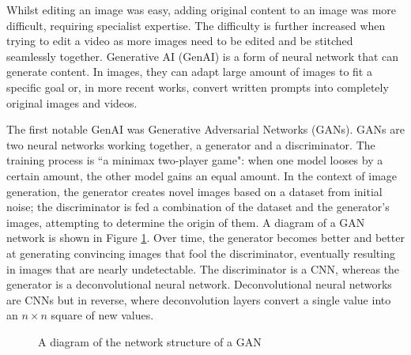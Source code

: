 Whilst editing an image was easy, adding original content to an image was more difficult, requiring specialist expertise. The difficulty is further increased when trying to edit a video as more images need to be edited and be stitched seamlessly together. Generative AI (GenAI) is a form of neural network that can generate content. In images, they can adapt large amount of images to fit a specific goal or, in more recent works, convert written prompts into completely original images and videos.

The first notable GenAI was Generative Adversarial Networks (GANs)\cite{goodfellow2014generative}. GANs are two neural networks working together, a generator and a discriminator. The training process is ``a minimax two-player game": when one model looses by a certain amount, the other model gains an equal amount. In the context of image generation, the generator creates novel images based on a dataset from initial noise; the discriminator is fed a combination of the dataset and the generator's images, attempting to determine the origin of them. A diagram of a GAN network is shown in Figure \ref{fig:gan-diagram}. Over time, the generator becomes better and better at generating convincing images that fool the discriminator, eventually resulting in images that are nearly undetectable. The discriminator is a CNN, whereas the generator is a deconvolutional neural network\cite{zeiler2011adaptive}. Deconvolutional neural networks are CNNs but in reverse, where deconvolution layers convert a single value into an $n \times n$ square of new values.

\begin{figure}[h]
    \centering
    \caption{A diagram of the network structure of a GAN}
    \label{fig:gan-diagram}
\end{figure}

